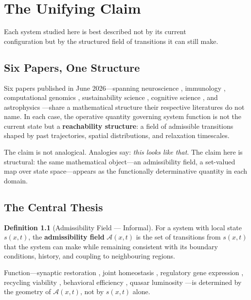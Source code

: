 \documentclass[12pt, a4paper, twoside]{book}
\theoremstyle{definition}
\newtheorem{definition}{Definition}[chapter]
\theoremstyle{remark}
\newcommand{\Adm}{\mathcal{A}}
\newcommand{\term}[1]{\textbf{#1}}
\begin{document}
\mainmatter

\chapter{The Unifying Claim}
\label{ch:intro}

\epigraph{Each system studied here is best described not by its current\\
  configuration but by the structured field of transitions it can still make.}{}

\section{Six Papers, One Structure}

Six papers published in June 2026---spanning neuroscience \citep{driessen2026}, immunology \citep{davidson2026}, computational genomics \citep{spiro2026}, sustainability science \citep{tian2026}, cognitive science \citep{okitsu2026}, and astrophysics \citep{leung2026}---share a mathematical structure their respective literatures do not name. In each case, the operative quantity governing system function is not the current state but a \term{reachability structure}: a field of admissible transitions shaped by past trajectories, spatial distributions, and relaxation timescales.

The claim is not analogical. Analogies say: \emph{this looks like that}. The claim here is structural: the same mathematical object---an admissibility field, a set-valued map over state space---appears as the functionally determinative quantity in each domain.

\section{The Central Thesis}

\begin{definition}[Admissibility Field --- Informal]
\label{def:adm-informal}
For a system with local state $s(x,t)$, the \term{admissibility field} $\Adm(x,t)$ is the set of transitions from $s(x,t)$ that the system can make while remaining consistent with its boundary conditions, history, and coupling to neighbouring regions.
\end{definition}

Function---synaptic restoration \citep{driessen2026}, joint homeostasis \citep{davidson2026}, regulatory gene expression \citep{spiro2026}, recycling viability \citep{tian2026}, behavioral efficiency \citep{okitsu2026}, quasar luminosity \citep{leung2026}---is determined by the geometry of $\Adm(x,t)$, not by $s(x,t)$ alone.
\end{document}
